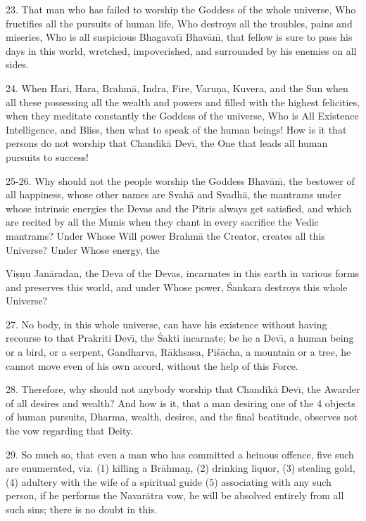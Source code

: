 23. That man who has failed to worship the Goddess of the whole universe, Who fructifies all the pursuits of human life, Who destroys all the troubles, pains and miseries, Who is all suspicious Bhagavat\={\i} Bhav\=an\={\i}, that fellow is sure to pass his days in this world, wretched, impoverished, and surrounded by his enemies on all sides.

24. When Hari, Hara, Brahm\=a, Indra, Fire, Varu\d{n}a, Kuvera, and the Sun when all these possessing all the wealth and powers and filled with the highest felicities, when they meditate constantly the Goddess of the universe, Who is All Existence Intelligence, and Bliss, then what to speak of the human beings! How is it that persons do not worship that Chandik\=a Dev\={\i}, the One that leads all human pursuits to success!

25-26. Why should not the people worship the Goddess Bhav\=an\={\i}, the bestower of all happiness, whose other names are Svah\=a and Svadh\=a, the mantrams under whose intrinsic energies the Devas and the Pitris always get satisfied, and which are recited by all the Munis when they chant in every sacrifice the Vedic mantrams? Under Whose Will power Brahm\=a the Creator, creates all this Universe? Under Whose energy, the

Vi\d{s}\d{n}u Jan\=aradan, the Deva of the Devas, incarnates in this earth in various forms and preserves this world, and under Whose power, \'Sankara destroys this whole Universe?

27. No body, in this whole universe, can have his existence without having recourse to that Prakriti Dev\={\i}, the \'Sakti incarnate; be he a Dev\={\i}, a human being or a bird, or a serpent, Gandharva, R\=akhsasa, Pi\'s\=acha, a mountain or a tree, he cannot move even of his own accord, without the help of this Force.

28. Therefore, why should not anybody worship that Chandik\=a Dev\={\i}, the Awarder of all desires and wealth? And how is it, that a man desiring one of the 4 objects of human pursuits, Dharma, wealth, desires, and the final beatitude, observes not the vow regarding that Deity.

29. So much so, that even a man who has committed a heinous offence, five such are enumerated, viz. (1) killing a Br\=ahma\d{n}, (2) drinking liquor, (3) stealing gold, (4) adultery with the wife of a spiritual guide (5) associating with any such person, if he performs the Navar\=atra vow, he will be absolved entirely from all such sins; there is no doubt in this.

